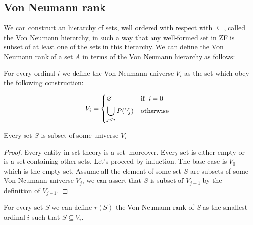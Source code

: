\subsection{Von Neumann rank}
We can construct an hierarchy of sets, well ordered with respect with $\subseteq$, 
called the Von Neumann hierarchy, in such a way that any well-formed set in ZF is subset of 
at least one of the sets in this hierarchy. We can define the Von Neumann rank of a set $A$ in 
terms of the Von Neumann hierarchy as follows:

\begin{definition}
    For every ordinal $i$ we define the Von Neumann universe $V_i$ as the set which 
    obey the following construction:
    
    \begin{equation*}
        V_i = \begin{dcases}
            \varnothing            & \text{if}\;\; i = 0 \\
            \bigcup_{j < i} P(V_j) & \text{otherwise} \\
        \end{dcases}
    \end{equation*}
\end{definition}

\begin{theorem}
    Every set $S$ is subset of some universe $V_i$
\end{theorem}
\begin{proof}
    Every entity in set theory is a set, moreover. Every set is either empty or is a set containing 
    other sets. Let's proceed by induction. The base case is
    $V_0$ which is the empty set. Assume all the element of some set $S$ are subsets of  
    some Von Neumann universe $V_j$, we can assert that $S$ is subset of $V_{j+1}$ by 
    the definition of $V_{j+1}$.
\end{proof}

\begin{definition}
    For every set $S$ we can define $r(S)$ the Von Neumann rank of $S$ as the smallest
    ordinal $i$ such that $S \subseteq V_i$.
\end{definition}
